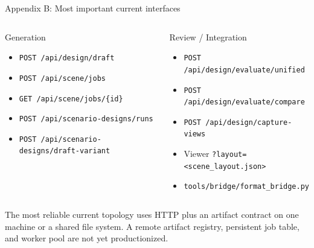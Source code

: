 \documentclass[aspectratio=169,10pt]{ctexbeamer}
\begin{document}
\begin{frame}{Appendix B: Most important current interfaces}
  \begin{columns}[T,onlytextwidth]
      \begin{block}{Generation}
        \begin{itemize}
          \item \texttt{POST /api/design/draft}
          \item \texttt{POST /api/scene/jobs}
          \item \texttt{GET /api/scene/jobs/\{id\}}
          \item \texttt{POST /api/scenario-designs/runs}
          \item \texttt{POST /api/scenario-designs/draft-variant}
        \end{itemize}
      \end{block}
      \begin{exampleblock}{Review / Integration}
        \begin{itemize}
          \item \texttt{POST /api/design/evaluate/unified}
          \item \texttt{POST /api/design/evaluate/compare}
          \item \texttt{POST /api/design/capture-views}
          \item Viewer \texttt{?layout=<scene\_layout.json>}
          \item \texttt{tools/bridge/format\_bridge.py}
        \end{itemize}
      \end{exampleblock}
  \end{columns}
  \deckgap
  \begin{callout}
    The most reliable current topology uses HTTP plus an artifact contract on one machine or a shared file system. A remote artifact registry, persistent job table, and worker pool are not yet productionized.
  \end{callout}
\end{frame}
\end{document}
